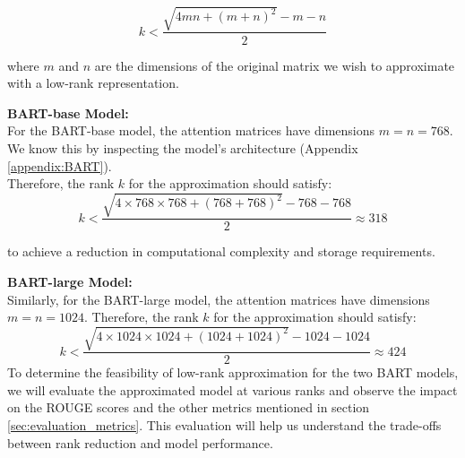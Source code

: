             \[
            k < \frac{\sqrt{4mn + (m+n)^2} - m - n}{2}
            \]
            
            where \(m\) and \(n\) are the dimensions of the original matrix we wish to approximate with a low-rank representation.
            
            \textbf{BART-base Model:}\\
            For the BART-base model, the attention matrices have dimensions \(m = n = 768\). We know this by inspecting the model's architecture (Appendix \ref{appendix:BART}).\\
            Therefore, the rank \(k\) for the approximation should satisfy:
            \[
            k < \frac{\sqrt{4 \times 768 \times 768 + (768 + 768)^2} - 768 - 768}{2} \approx 318
            \]
            
            \label{appropriate_rank}to achieve a reduction in computational complexity and storage requirements.

            \textbf{BART-large Model:}\\
            Similarly, for the BART-large model, the attention matrices have dimensions \(m = n = 1024\). Therefore, the rank \(k\) for the approximation should satisfy:
            \[
            k < \frac{\sqrt{4 \times 1024 \times 1024 + (1024 + 1024)^2} - 1024 - 1024}{2} \approx 424
            \]
            To determine the feasibility of low-rank approximation for the two BART models, we will evaluate the approximated model at various ranks and observe the impact on the ROUGE scores and the other metrics mentioned in section \ref{sec:evaluation_metrics}. This evaluation will help us understand the trade-offs between rank reduction and model performance.
            

            


